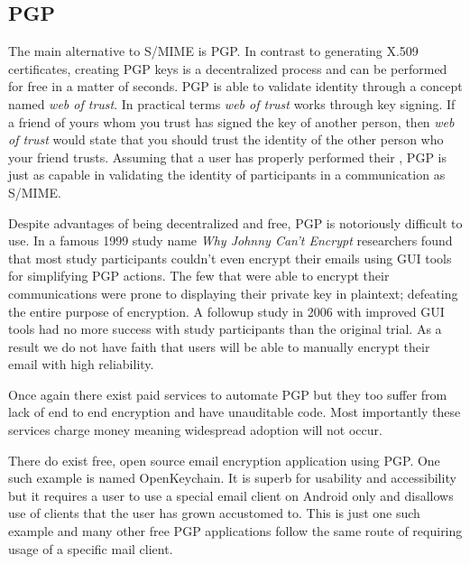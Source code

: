 \documentclass[10pt]{article}
\begin{document}
\begin{multicols}{2}
\subsection{PGP}
\par The main alternative to S/MIME is PGP. In contrast to generating X.509 certificates, creating PGP keys is a decentralized process and can be performed for free in a matter of seconds. PGP is able to validate identity through a concept named \textit{web of trust}. In practical terms \textit{web of trust} works through key signing. If a friend of yours whom you trust has signed the key of another person, then \textit{web of trust} would state that you should trust the identity of the other person who your friend trusts\cite{zimmermann1995official}. Assuming that a user has properly performed their , PGP is just as capable in validating the identity of participants in a communication as S/MIME\cite{furnell2013usable}.
\par Despite advantages of being decentralized and free, PGP is notoriously difficult to use. In a famous 1999 study name \textit{Why Johnny Can't Encrypt} researchers found that most study participants couldn't even encrypt their emails using GUI tools for simplifying PGP actions. The few that were able to encrypt their communications were prone to displaying their private key in plaintext; defeating the entire purpose of encryption\cite{whitten1999johnny}. A followup study in 2006 with improved GUI tools had no more success with study participants than the original trial\cite{sheng2006johnny}. As a result we do not have faith that users will be able to manually encrypt their email with high reliability.
\par Once again there exist paid services to automate PGP but they too suffer from lack of end to end encryption and have unauditable code\cite{ciphermail-gateway,hushmail,eff-scorecard}. Most importantly these services charge money meaning widespread adoption will not occur.
\par There do exist free, open source email encryption application using PGP. One such example is named OpenKeychain. It is superb for usability and accessibility but it requires a user to use a special email client on Android only and disallows use of clients that the user has grown accustomed to\cite{openkeychain}. This is just one such example and many other free PGP applications follow the same route of requiring usage of a specific mail client.

\end{multicols}
\end{document}
